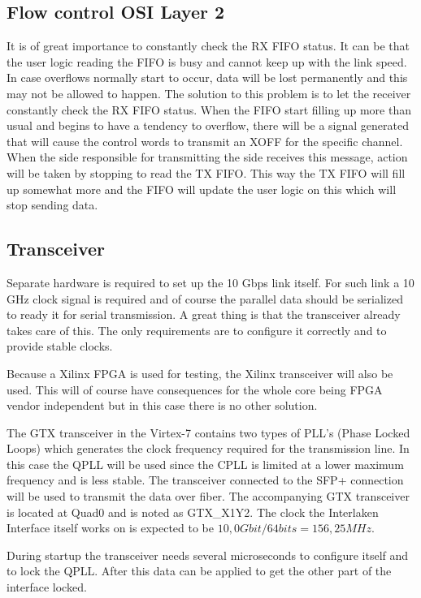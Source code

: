 \subsection[Flow control]{Flow control \hfill OSI Layer 2}
	\label{subsec:Hardware_FlowControl}
	It is of great importance to constantly check the RX FIFO status. It can be that the user logic reading the FIFO is busy and cannot keep up with the link speed. In case overflows normally start to occur, data will be lost permanently and this may not be allowed to happen. The solution to this problem is to let the receiver constantly check the RX FIFO status. When the FIFO start filling up more than usual and begins to have a tendency to overflow, there will be a signal generated that will cause the control words to transmit an XOFF for the specific channel. 
	When the side responsible for transmitting the side receives this message, action will be taken by stopping to read the TX FIFO. This way the TX FIFO will fill up somewhat more and the FIFO will update the user logic on this which will stop sending data.
		

\subsection{Transceiver}
	\label{subsec:Hardware_Transceiver}
	Separate hardware is required to set up the 10 Gbps link itself. For such link a 10 GHz clock signal is required and of course the parallel data should be serialized to ready it for serial transmission. A great thing is that the transceiver already takes care of this. The only requirements are to configure it correctly and to provide stable clocks.
	
	Because a Xilinx FPGA is used for testing, the Xilinx transceiver will also be used. This will of course have consequences for the whole core being FPGA vendor independent but in this case there is no other solution. 
	
	The GTX transceiver in the Virtex-7 contains two types of PLL's (Phase Locked Loops) which generates the clock frequency required for the transmission line. In this case the QPLL will be used since the CPLL is limited at a lower maximum frequency and is less stable. The transceiver connected to the SFP+ connection will be used to transmit the data over fiber. The accompanying GTX transceiver is located at Quad0 and is noted as GTX\_X1Y2. The clock the Interlaken Interface itself works on is expected to be $10,0 Gbit / 64 bits = 156,25 MHz$.
	
	During startup the transceiver needs several microseconds to configure itself and to lock the QPLL. After this data can be applied to get the other part of the interface locked.
	
